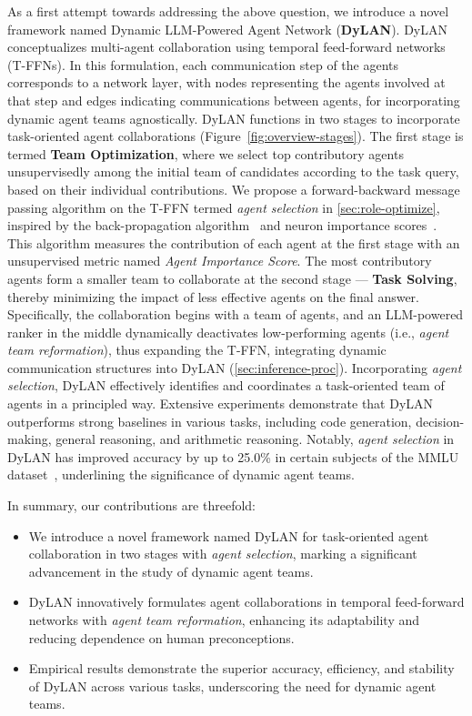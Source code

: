 \documentclass{article} %
\begin{document}
As a first attempt towards addressing the above question, we introduce a novel framework named Dynamic LLM-Powered Agent Network (\textbf{DyLAN}). DyLAN conceptualizes multi-agent collaboration using temporal feed-forward networks (T-FFNs). In this formulation, each communication step of the agents corresponds to a network layer, with nodes representing the agents involved at that step and edges indicating communications between agents, for incorporating dynamic agent teams agnostically. 
DyLAN functions in two stages to incorporate task-oriented agent collaborations (Figure~\ref{fig:overview-stages}). The first stage is termed \textbf{Team Optimization}, where we select top contributory agents unsupervisedly among the initial team of candidates according to the task query, based on their individual contributions. We propose a forward-backward message passing algorithm on the T-FFN termed \textit{agent selection} in \cref{sec:role-optimize}, inspired by the back-propagation algorithm~\citep{rumelhart1986learning} and neuron importance scores~\citep{imp-score}. This algorithm measures the contribution of each agent at the first stage with an unsupervised metric named \emph{Agent Importance Score}. The most contributory agents form a smaller team to collaborate at the second stage — \textbf{Task Solving}, thereby minimizing the impact of less effective agents on the final answer. Specifically, the collaboration begins with a team of agents, and an LLM-powered ranker in the middle dynamically deactivates low-performing agents (i.e., \textit{agent team reformation}), thus expanding the T-FFN, integrating dynamic communication structures into DyLAN (\cref{sec:inference-proc}). 
Incorporating \textit{agent selection}, DyLAN effectively identifies and coordinates a task-oriented team of agents in a principled way. Extensive experiments demonstrate that DyLAN outperforms strong baselines in various tasks, including code generation, decision-making, general reasoning, and arithmetic reasoning. Notably, \textit{agent selection} in DyLAN has improved accuracy by up to 25.0\% in certain subjects of the MMLU dataset~\citep{mmlu}, underlining the significance of dynamic agent teams.


In summary, our contributions are threefold:
\begin{itemize}\setlength{\itemsep}{0pt}
    \item We introduce a novel framework named DyLAN for task-oriented agent collaboration in two stages with \textit{agent selection}, marking a significant advancement in the study of dynamic agent teams.
    \item DyLAN innovatively formulates agent collaborations in temporal feed-forward networks with \textit{agent team reformation}, enhancing its adaptability and reducing dependence on human preconceptions.
    \item Empirical results demonstrate the superior accuracy, efficiency, and stability of DyLAN across various tasks, underscoring the need for dynamic agent teams.
\end{itemize}
\end{document}
